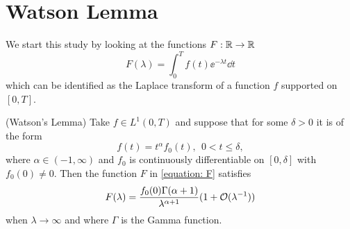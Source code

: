\section{Watson Lemma}

We start this study by looking at the functions $F: \mathbb{R} \rightarrow \mathbb{R}$
\begin{equation}
	F(\lambda) = \int_{0}^{T} f(t) \ee^{-\lambda t} \dd t
	\label{equation: F}
\end{equation}
which can be identified as the Laplace transform of a function $f$ supported on $[0,T]$.

\begin{thm}	
	(Watson's Lemma) Take $f \in L^1(0,T)$ and suppose that for some $\delta > 0$ it is of the form
	$$f(t) = t^\alpha f_0(t), \ \ 0 < t \leq \delta,$$
	where $\alpha \in (-1, \infty)$ and $f_0$ is continuously differentiable on $[0, \delta]$ with $f_0(0) \neq 0$. Then the function $F$ in \ref{equation: F} satisfies
	\begin{equation}
		F(\lambda) = \frac{f_0(0) \Gamma(\alpha + 1)}{\lambda^{\alpha + 1}} (1 + \mathcal{O}(\lambda^{-1}))
	\end{equation}
	when $\lambda \rightarrow \infty$ and where $\Gamma$ is the Gamma function.
\end{thm}

